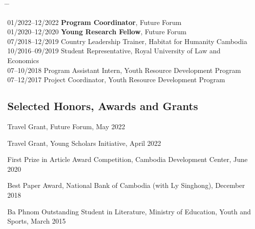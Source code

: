 \documentclass[10pt,a4paper]{article}
\newcommand{\tabbedblock}[1]{

	\begin{tabbing}
		\hspace{3cm} \= \hspace{4cm} \= \kill
		#1
	\end{tabbing}
}
\begin{document}
\tabbedblock{
	
	01/2022--12/2022 \> \textbf{Program Coordinator}, Future Forum \\
	
	01/2020--12/2020 \> \textbf{Young Research Fellow}, Future Forum \\

	07/2018--12/2019 \> Country Leadership Trainer, Habitat for Humanity Cambodia\\
		
	10/2016--09/2019 \> Student Representative, Royal University of Law and Economics\\

	07--10/2018 \> Program Assistant Intern, Youth Resource Development Program\\

	07--12/2017 \> Project Coordinator, Youth Resource Development Program\\ 

}

\vspace{-2em}
\subsection*{Selected Honors, Awards and Grants}

\parindent=0pt
	
	Travel Grant, Future Forum, May 2022 %
	
	Travel Grant, Young Scholars Initiative, April 2022  %
	
	First Prize in Article Award Competition, Cambodia Development Center, June 2020 %
	
	Best Paper Award, National Bank of Cambodia (with Ly Singhong), December 2018 %
	
	Ba Phnom Outstanding Student in Literature, Ministry of Education, Youth and Sports, March 2015


\end{document}
